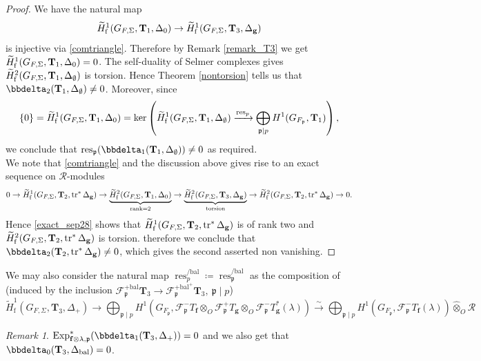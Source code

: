 \documentclass[10pt]{amsart}
\numberwithin{equation}{section}
\theoremstyle{definition}
\theoremstyle{remark} %
\newtheorem{rmk}[thm]{Remark}
\newcommand{\Exp}{\operatorname{Exp}}
\DeclareMathOperator{\res}{res}
\DeclareMathOperator{\tr}{{tr}^*}
\renewcommand{\b}{\mathrm{bal}}
\newcommand{\f}{\mathbf{f}}
\newcommand{\scrF}{\mathscr{F}}
\newcommand{\g}{\mathbf{g}}
\newcommand{\p}{\mathfrak{p}}
\newcommand{\R}{\mathcal{R}}
\newcommand{\T}{\mathbf{T}}
\begin{document}
		\begin{proof}
			We have the natural map
			$$ \widetilde{H}^1_{\rm f}(G_{F,\Sigma}, \T_1, \Delta_0) \rightarrow \widetilde{H}^1_{\rm f}(G_{F,\Sigma}, \T_3, \Delta_\g) $$
			is injective via \ref{comtriangle}. Therefore by Remark \ref{remark_T3} we get $ \widetilde{H}_{\rm f}^1(G_{F,\Sigma}, \T_1, \Delta_0) = 0$. The self-duality of Selmer complexes gives $ \widetilde{H}_{\rm f}^2(G_{F,\Sigma}, \T_1, \Delta_\emptyset) $ is torsion. Hence Theorem \ref{nontorsion} tells us that $ \bbdelta_2(\T_{1},\Delta_\emptyset) \ne 0 $. Moreover, since 
			$$ \{0\} =  \widetilde{H}^1_{\rm f}(G_{F,\Sigma}, \T_1, \Delta_0) = \ker\left(  \widetilde{H}^1_{\rm f}(G_{F,\Sigma}, \T_1, \Delta_\emptyset) \xrightarrow{\res_p} \bigoplus_{\p \mid p} H^1(G_{F_\p}, \T_{1}) \right),  
			$$
			we conclude that $ \res_\p(\bbdelta_1(\T_{1},\Delta_\emptyset)) \ne 0 $ as required.\\
			We note that \ref{comtriangle} and the discussion above gives rise to an exact sequence on $ \R $-modules
			\begin{equation}\label{exact_sep28}
				0 \rightarrow 	\widetilde{H}^1_{\rm f}(G_{F,\Sigma}, \T_2, \tr \Delta_\g) \rightarrow\underbrace{ \widetilde{H}^2_{\rm f}(G_{F,\Sigma}, \T_1, \Delta_0)}_{\rm rank =2} \rightarrow \underbrace{\widetilde{H}^2_{\rm f}(G_{F,\Sigma}, \T_3, \Delta_\g)}_{\rm torsion}\rightarrow  \widetilde{H}^2_{\rm f}(G_{F,\Sigma}, \T_2, \tr \Delta_\g) \rightarrow 0 . 	
			\end{equation} 
			Hence \ref{exact_sep28} shows that $ \widetilde{H}^1_{\rm f}(G_{F,\Sigma}, \T_2, \tr \Delta_\g) $ is of rank two and $ \widetilde{H}^2_{\rm f}(G_{F,\Sigma}, \T_2, \tr \Delta_\g) $ is torsion. therefore we conclude that $ \bbdelta_2(\T_{2}, \tr\Delta_\g) \ne 0 $, which gives the second asserted non vanishing. 
		\end{proof}
		We may also consider the natural map $ \res^{/\b}_p \coloneqq \res^{/\b}_\p $ as the composition of (induced by the inclusion $ \scrF^{+\b}_{\p} \T_{3} \rightarrow \scrF^{+\mathrm{bal}^+}_{\p} \T_{3}, \: \p \mid p $)
		$$  \widetilde{H}^1_{\mathrm{f}}(G_{F,\Sigma}, \T_{3}, \Delta_+) \rightarrow \bigoplus_{\p \mid p} H^1(G_{F_{\p}}, \scrF^-_{\p}T_{\f} \otimes_O \scrF^+_{\p}T_{\g} \otimes_O \scrF^-_{\p}T_{\g}^*(\lambda)) \xrightarrow{\sim} \bigoplus_{\p \mid p} H^1(G_{F_{\p}}, \scrF^-_{\p}T_{\f} (\lambda)) \widehat{\otimes}_O \R $$
		\begin{rmk}
			$ \Exp^*_{\f \otimes \lambda, \p}(\bbdelta_1(\T_{3},\Delta_{+})) = 0 $ and we also get that $\bbdelta_0(\T_{3},\Delta_{\mathrm{bal}}) = 0$.
		\end{rmk}
\end{document}

